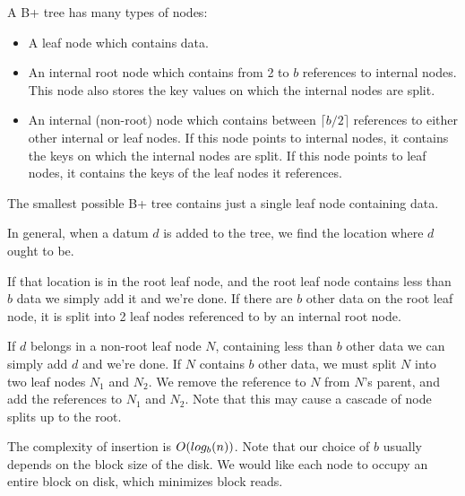 A B+ tree has many types of nodes:

\begin{itemize}

\item A leaf node which contains data.

\item An internal root node which contains from 2 to $b$ references to
  internal nodes.  This node also stores the key values on which the
  internal nodes are split.

\item An internal (non-root) node which contains between $\lceil b/2
  \rceil$ references to either other internal or leaf nodes.  If this
  node points to internal nodes, it contains the keys on which the
  internal nodes are split.  If this node points to leaf nodes, it
  contains the keys of the leaf nodes it references.

\end{itemize}

The smallest possible B+ tree contains just a single leaf node
containing data.  

In general, when a datum $d$ is added to the tree, we find the
location where $d$ ought to be.  

If that location is in the root leaf node, and the root leaf node
contains less than $b$ data we simply add it and we're done.  If there
are $b$ other data on the root leaf node, it is split into 2 leaf
nodes referenced to by an internal root node.

If $d$ belongs in a non-root leaf node $N$, containing less than $b$
other data we can simply add $d$ and we're done.  If $N$ contains $b$
other data, we must split $N$ into two leaf nodes $N_1$ and $N_2$.  We
remove the reference to $N$ from $N$'s parent, and add the references
to $N_1$ and $N_2$.  Note that this may cause a cascade of node splits
up to the root.

The complexity of insertion is $O\!\left(log_b(n)\right)$.  Note that our choice
of $b$ usually depends on the block size of the disk.  We would like
each node to occupy an entire block on disk, which minimizes block
reads.
